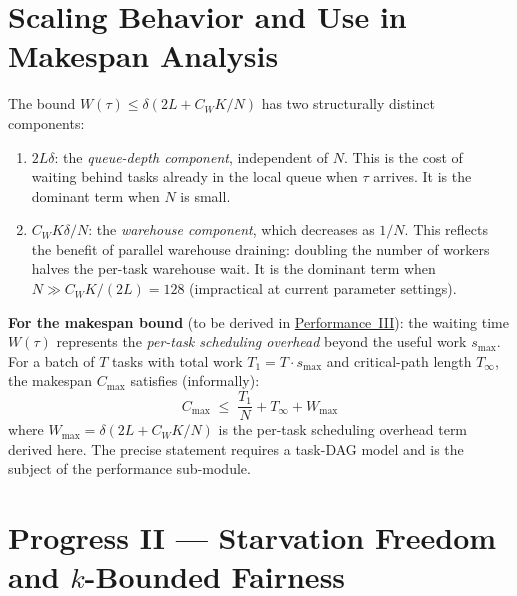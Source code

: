 \documentclass[11pt,a4paper]{article}
\begin{document}
\section{Scaling Behavior and Use in Makespan Analysis}

The bound $W(\tau) \leq \delta(2L + C_W K/N)$ has two structurally
distinct components:

\begin{enumerate}
  \item $2L\delta$: the \emph{queue-depth component}, independent
        of $N$.  This is the cost of waiting behind tasks already
        in the local queue when $\tau$ arrives.  It is the dominant
        term when $N$ is small.

  \item $C_W K\delta/N$: the \emph{warehouse component}, which
        decreases as $1/N$.  This reflects the benefit of parallel
        warehouse draining: doubling the number of workers halves
        the per-task warehouse wait.  It is the dominant term when
        $N \gg C_W K / (2L) = 128$ (impractical at current
        parameter settings).
\end{enumerate}

\medskip\noindent\textbf{For the makespan bound} (to be derived in
\hyperref[chap:makespan]{Performance~III}): the waiting time $W(\tau)$
represents the \emph{per-task scheduling overhead} beyond the useful
work $s_{\max}$.  For a batch of $T$ tasks with total work
$T_1 = T \cdot s_{\max}$ and critical-path length $T_\infty$, the
makespan $C_{\max}$ satisfies (informally):
\[
  C_{\max} \;\leq\; \frac{T_1}{N} + T_\infty + W_{\max}
\]
where $W_{\max} = \delta(2L + C_W K/N)$ is the per-task scheduling
overhead term derived here.  The precise statement requires a
task-DAG model and is the subject of the performance sub-module.


\section*{Progress II --- Starvation Freedom and $k$-Bounded Fairness}
\label{chap:starvation}
\end{document}
